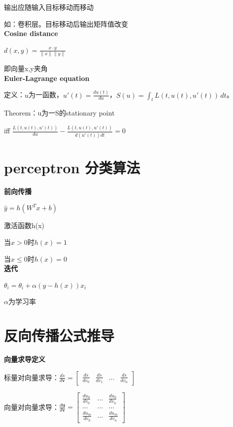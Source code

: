 \documentclass[UTF8]{ctexart}
\begin{document}
  输出应随输入目标移动而移动

  如：卷积层。目标移动后输出矩阵值改变\\
\textbf{Cosine distance}

  $d(x, y) = \frac{x \cdot y}{\|x\|\|y\|}$

  即向量x,y夹角\\
\textbf{Euler-Lagrange equation}

  定义：$u$为一函数，$u'(t) = \frac{du(t)}{du}$，$S(u)= \int_{t} L(t, u(t), u'(t)) \,dt$。

  Theorem：u为一S的stationary point
  
  \quad iff $\frac{L(t, u(t), u'(t))}{du} - \frac{L(t, u(t), u'(t))}{d(u'(t))dt} = 0$

\section{perceptron 分类算法}
\noindent \textbf{前向传播}

  $\hat{y} = h(W^Tx + b)$
  
  激活函数h(x)

  \quad 当$x > 0$时$h(x) = 1$

  \quad 当$x \leq 0$时$h(x) = 0$\\
\textbf{迭代}

  $\theta_i = \theta_i + \alpha(y - h(x))x_i$
  
  \quad $\alpha$为学习率

\section{反向传播公式推导}
\noindent \textbf{向量求导定义}

  标量对向量求导：$\frac{ds}{d\textbf{v}} = \begin{bmatrix}
    \frac{ds}{dv_0} & \frac{ds}{dv_1} & ... & \frac{ds}{dv_n}
    \end{bmatrix}$

  向量对向量求导：$\frac{d\textbf{u}}{d\textbf{v}} = \begin{bmatrix}
    \frac{du_0}{dv_0} & ... & \frac{du_0}{dv_n} \\
    ... & ... & ... \\
    \frac{du_m}{dv_0} & ... & \frac{du_m}{dv_n}
    \end{bmatrix}$
  
\end{document}
